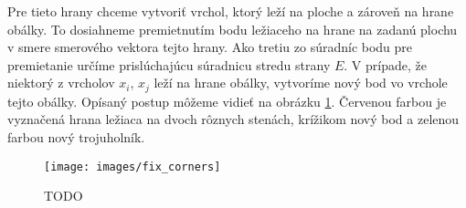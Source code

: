 \begin{itemize}
{                Pre tieto hrany chceme vytvoriť vrchol, ktorý leží na ploche a zároveň na hrane obálky.
                To dosiahneme premietnutím bodu ležiaceho na hrane na zadanú plochu v smere 
                smerového vektora tejto hrany. Ako tretiu zo súradníc bodu pre premietanie určíme 
                prislúchajúcu súradnicu stredu strany $E$. V prípade, že niektorý z vrcholov 
                $x_i$, $x_j$ leží na hrane obálky, vytvoríme nový bod vo vrchole tejto obálky. 
                Opísaný postup môžeme vidieť na obrázku \ref{obr:fix_corners}. Červenou farbou 
                je vyznačená hrana ležiaca na dvoch rôznych stenách, krížikom nový bod a zelenou farbou
                nový trojuholník.
                
                
                \begin{figure}
                    \centerline{\texttt{[image: images/fix\_corners]}}
                    \caption[TODO]{TODO}
                    \label{obr:fix_corners}
                \end{figure}

    }
\end{itemize}